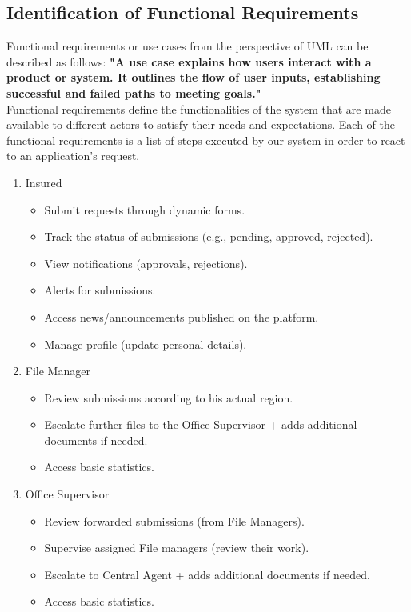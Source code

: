 \subsection{Identification of Functional Requirements}
Functional requirements or use cases from the perspective of UML can be described as follows: \textbf{"A use case explains how users interact with a product or system. It outlines the flow of user inputs, establishing successful and failed paths to meeting goals."}\cite{samplewebs4}\\
Functional requirements define the functionalities of the system that are made available to different actors to satisfy their needs and expectations.
Each of the functional requirements is a list of steps executed by our system in order to react to an application's request.
\begin{enumerate}
    \item Insured

     \begin{itemize}
         \item Submit requests through dynamic forms.
         \item Track the status of submissions (e.g., pending, approved, rejected).
         \item View notifications (approvals, rejections).
         \item Alerts for submissions.
         \item Access news/announcements published on the platform.
         \item Manage profile (update personal details).
     \end{itemize}
 
\item File Manager
\begin{itemize}
    \item Review submissions according to his actual region.
    \item Escalate further files to the Office Supervisor + adds additional documents if needed.
    \item Access basic statistics.
\end{itemize}
    
\item Office Supervisor
\begin{itemize}
    \item Review forwarded submissions (from File Managers).
    \item Supervise assigned File managers (review their work).
    \item Escalate to Central Agent  + adds additional documents if needed.
    \item Access basic statistics.
\end{itemize}
    

\end{enumerate}
